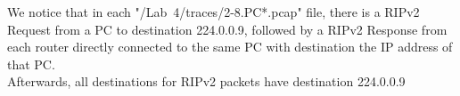 We notice that in each "/Lab\ 4/traces/2-8.PC*.pcap" file, there is a RIPv2 Request from a PC to destination 224.0.0.9, followed by a RIPv2 Response from each router directly connected to the same PC with destination the IP address of that PC. \\
Afterwards, all destinations for RIPv2 packets have destination 224.0.0.9
